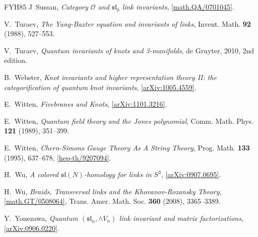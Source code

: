 \documentclass{compositio}
\theoremstyle{definition}
\numberwithin{equation}{section}
\begin{document}
\begin{thebibliography}{FYH{\etalchar{+}}85}
J~Sussan, \emph{Category {$\mathcal O$} and {$\mathfrak{sl}_k$} link
  invariants}, \href{http://arxiv.org/abs/math/0701045}{[math.QA/0701045]}.

V.~Turaev, \emph{The {Y}ang-{B}axter equation and invariants of links}, Invent.
  Math. \textbf{92} (1988), 527--553.

V.~Turaev, \emph{Quantum invariants of knots and 3-manifolds}, de Gruyter, 2010,
  2nd edition.

B.~Webster, \emph{Knot invariants and higher representation theory {II}: the
  categorification of quantum knot invariants},
  \href{http://arxiv.org/abs/1005.4559}{[arXiv:1005.4559]}.

E.~Witten, \emph{Fivebranes and {K}nots},
  \href{http://arxiv.org/abs/1101.3216}{[arXiv:1101.3216]}.

E.~Witten, \emph{Quantum field theory and the {J}ones polynomial}, Comm. Math.
  Phys. \textbf{121} (1989), 351--399.

E.~Witten, \emph{Chern-{S}imons {G}auge {T}heory {A}s {A} {S}tring {T}heory},
  Prog. Math. \textbf{133} (1995), 637--678,
  \href{http://arxiv.org/abs/hep-th/9207094}{[hep-th/9207094]}.

H.~Wu, \emph{A colored {$\mathfrak{sl}(N)$}-homology for links in {$S^3$}},
  \href{http://arxiv.org/abs/0907.0695}{[arXiv:0907.0695]}.

H.~Wu, \emph{Braids, {T}ransversal links and the {K}hovanov-{R}ozansky {T}heory},
  \href{http://arxiv.org/abs/math/0508064}{[math.GT/0508064]}, Trans. Amer. Math. Soc. \textbf{360}
  (2008), 3365--3389.

Y.~Yonezawa, \emph{Quantum {$(\mathfrak{sl}_n, \wedge V_n)$} link invariant and
  matrix factorizations},
  \href{http://arxiv.org/abs/0906.0220}{[arXiv:0906.0220]}.

\end{thebibliography}
\end{document}
